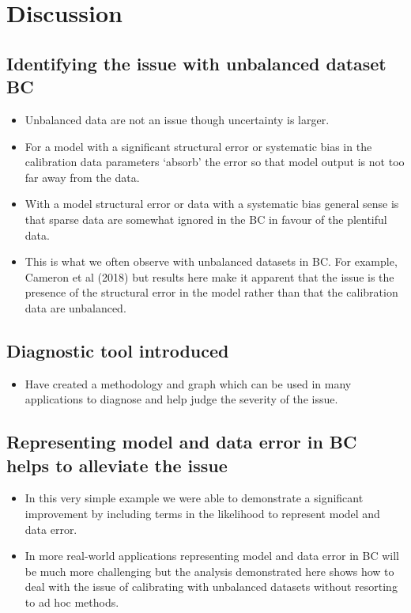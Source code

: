 \documentclass[]{article}
\providecommand{\tightlist}{%
  \setlength{\itemsep}{0pt}\setlength{\parskip}{0pt}}
\begin{document}
\section{Discussion}\label{discussion}

\subsection{Identifying the issue with unbalanced dataset
BC}\label{identifying-the-issue-with-unbalanced-dataset-bc}

\begin{itemize}
\tightlist
\item
  Unbalanced data are not an issue though uncertainty is larger.
\item
  For a model with a significant structural error or systematic bias in
  the calibration data parameters `absorb' the error so that model
  output is not too far away from the data.
\item
  With a model structural error or data with a systematic bias general
  sense is that sparse data are somewhat ignored in the BC in favour of
  the plentiful data.
\item
  This is what we often observe with unbalanced datasets in BC. For
  example, Cameron et al (2018) but results here make it apparent that
  the issue is the presence of the structural error in the model rather
  than that the calibration data are unbalanced.
\end{itemize}

\subsection{Diagnostic tool
introduced}\label{diagnostic-tool-introduced}

\begin{itemize}
\tightlist
\item
  Have created a methodology and graph which can be used in many
  applications to diagnose and help judge the severity of the issue.
\end{itemize}

\subsection{Representing model and data error in BC helps to alleviate
the
issue}\label{representing-model-and-data-error-in-bc-helps-to-alleviate-the-issue}

\begin{itemize}
\tightlist
\item
  In this very simple example we were able to demonstrate a significant
  improvement by including terms in the likelihood to represent model
  and data error.
\item
  In more real-world applications representing model and data error in
  BC will be much more challenging but the analysis demonstrated here
  shows how to deal with the issue of calibrating with unbalanced
  datasets without resorting to ad hoc methods.
\end{itemize}
\end{document}
